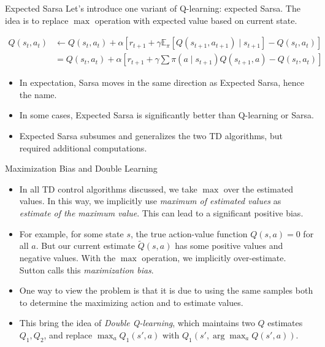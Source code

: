 \documentclass[handout]{beamer}
\begin{document}
\begin{frame}{Expected Sarsa}
\small
Let's introduce one variant of Q-learning: expected Sarsa. The idea is to replace $\max$ operation with expected value based on current state.

\begin{equation*}
\begin{aligned}
Q\left(s_{t}, a_{t}\right) & \leftarrow Q\left(s_{t}, a_{t}\right)+\alpha\left[r_{t+1}+\gamma \mathbb{E}_{\pi}\left[Q\left(s_{t+1}, a_{t+1}\right) \mid s_{t+1}\right]-Q\left(s_{t}, a_{t}\right)\right] \\
&=Q\left(s_{t}, a_{t}\right)+\alpha\left[r_{t+1}+\gamma \sum \pi\left(a \mid s_{t+1}\right) Q\left(s_{t+1}, a\right)-Q\left(s_{t}, a_{t}\right)\right]
\end{aligned}
\end{equation*}

\begin{itemize}
	\item In expectation, Sarsa moves in the same direction as Expected Sarsa, hence the name.
	\item In some cases, Expected Sarsa is significantly better than Q-learning or Sarsa.
	\item Expected Sarsa subsumes and generalizes the two TD algorithms, but required additional computations. 
\end{itemize}
\end{frame}


\begin{frame}{Maximization Bias and Double Learning}
\small
\begin{itemize}
	\item In all TD control algorithms discussed, we take $\max$ over the estimated values. In this way, we implicitly use \textit{maximum of estimated values} as \textit{estimate of the maximum value}. This can lead to a significant positive bias.
	\item For example, for some state $s$, the true action-value function $Q(s, a)=0 $ for all $a$. But our current estimate $\widetilde{Q}(s, a)$ has some positive values and negative values. With the $\max$ operation, we implicitly over-estimate. Sutton calls this \textit{maximization bias}.
\item 
One way to view the problem is that it is due to using the same samples both to determine the maximizing action and to estimate values.
\item This bring the idea of \textit{Double Q-learning}, which maintains two $Q$ estimates $Q_1, Q_2$, and replace $\max_a Q_1(s', a)$ with $Q_1(s', \arg\max_a Q(s',a))$.
\end{itemize}
\end{frame}
\end{document}

